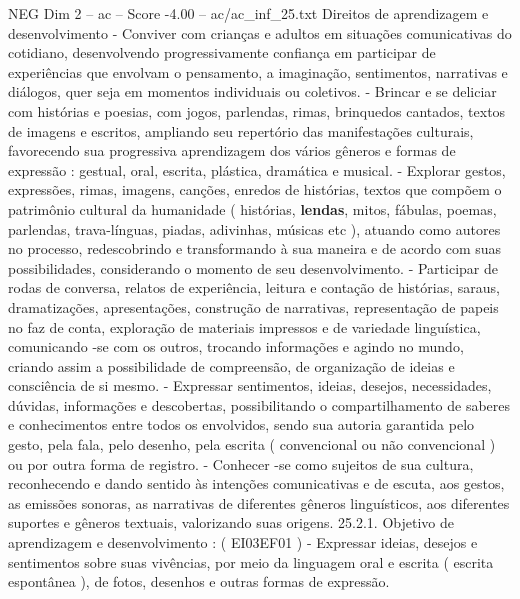 \begin{textsample}{NEG Dim 2 – ac – Score -4.00 – ac/ac\_inf\_25.txt}
Direitos de aprendizagem e desenvolvimento - Conviver com crianças e adultos em situações comunicativas do cotidiano, desenvolvendo progressivamente confiança em participar de experiências que envolvam o pensamento, a imaginação, sentimentos, narrativas e diálogos, quer seja em momentos individuais ou coletivos. - Brincar e se deliciar com histórias e poesias, com jogos, parlendas, rimas, brinquedos cantados, textos de imagens e escritos, ampliando seu repertório das manifestações culturais, favorecendo sua progressiva aprendizagem dos vários gêneros e formas de expressão : gestual, oral, escrita, plástica, dramática e musical. - Explorar gestos, expressões, rimas, imagens, canções, enredos de histórias, textos que compõem o patrimônio cultural da humanidade ( histórias, \textbf{lendas}, mitos, fábulas, poemas, parlendas, trava-línguas, piadas, adivinhas, músicas etc ), atuando como autores no processo, redescobrindo e transformando à sua maneira e de acordo com suas possibilidades, considerando o momento de seu desenvolvimento. - Participar de rodas de conversa, relatos de experiência, leitura e contação de histórias, saraus, dramatizações, apresentações, construção de narrativas, representação de papeis no faz de conta, exploração de materiais impressos e de variedade linguística, comunicando -se com os outros, trocando informações e agindo no mundo, criando assim a possibilidade de compreensão, de organização de ideias e consciência de si mesmo. - Expressar sentimentos, ideias, desejos, necessidades, dúvidas, informações e descobertas, possibilitando o compartilhamento de saberes e conhecimentos entre todos os envolvidos, sendo sua autoria garantida pelo gesto, pela fala, pelo desenho, pela escrita ( convencional ou não convencional ) ou por outra forma de registro. - Conhecer -se como sujeitos de sua cultura, reconhecendo e dando sentido às intenções comunicativas e de escuta, aos gestos, as emissões sonoras, as narrativas de diferentes gêneros linguísticos, aos diferentes suportes e gêneros textuais, valorizando suas origens. 25.2.1.
Objetivo de aprendizagem e desenvolvimento : ( EI03EF01 ) - Expressar ideias, desejos e sentimentos sobre suas vivências, por meio da linguagem oral e escrita ( escrita espontânea ), de fotos, desenhos e outras formas de expressão.

\end{textsample}

